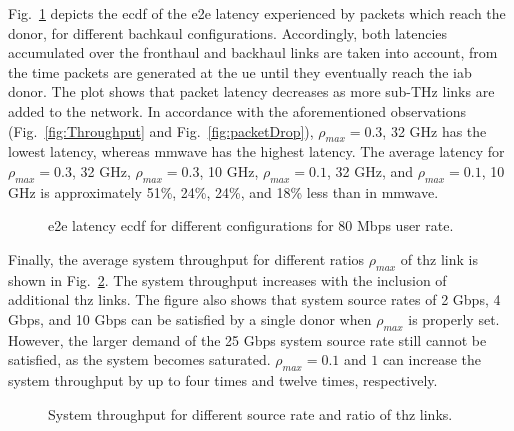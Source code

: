 Fig.~\ref{fig:Latency} depicts the \gls{ecdf} of the \gls{e2e} latency experienced by packets which reach the donor, for different bachkaul configurations. Accordingly, both latencies accumulated over the fronthaul and backhaul links are taken into account, from the time packets are generated at the \gls{ue} until they eventually reach the \gls{iab} donor. The plot shows that packet latency decreases as more sub-THz links are added to the network. In accordance with the aforementioned observations (Fig.~\ref{fig:Throughput} and Fig.~\ref{fig:packetDrop}), $\rho_{max} = 0.3$, 32 GHz has the lowest latency, whereas \gls{mmwave} has the highest latency. The average latency for $\rho_{max} = 0.3$, 32 GHz, $\rho_{max} = 0.3$, 10 GHz, $\rho_{max} = 0.1$, 32 GHz, and $\rho_{max} = 0.1$, 10 GHz is approximately 51\%, 24\%, 24\%, and 18\% less than in \gls{mmwave}.

\begin{figure}
    \centering
    \setlength{}
    \setlength{}
    
    \caption{\Gls{e2e} latency \gls{ecdf} for different configurations for 80 Mbps user rate.}
    \label{fig:Latency}
\end{figure}

Finally, the average system throughput for different ratios $\rho_{max}$ of \gls{thz} link is shown in Fig.~\ref{fig:THZtotal}.
The system throughput increases with the inclusion of additional \gls{thz} links. 
The figure also shows that system source rates of 2 Gbps, 4 Gbps, and 10 Gbps can be satisfied by a single donor when $\rho_{max}$ is properly set.
%
However, the larger demand of the 25 Gbps system source rate still cannot be satisfied, as the system becomes saturated.
$\rho_{max} = 0.1$ and $1$ can increase the system throughput by up to four times and twelve times, respectively.

\begin{figure}
    \centering
    \setlength{}
    \setlength{}
    
    \caption{System throughput for different source rate and ratio of \gls{thz} links.}
    \label{fig:THZtotal}
\end{figure}


